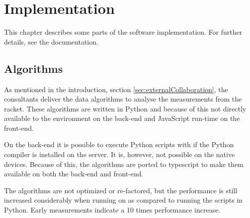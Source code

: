 \chapter{Implementation}
This chapter describes some parts of the software implementation.
For further details, see the documentation.

\section{Algorithms}
As mentioned in the introduction, section \ref{sec:externalCollaboration}, the consultants deliver the data algorithms to analyse the measurements from the racket.
These algorithms are written in Python and because of this not directly available to the  environment on the back-end and JavaScript run-time on the front-end.

On the back-end it is possible to execute Python scripts with  if the Python compiler is installed on the server.
It is, however, not possible on the native devices.
Because of this, the algorithms are ported to \gls{typescript} to make them available on both the back-end and front-end.

The algorithms are not optimized or re-factored, but the performance is still increased considerably when running on  as compared to running the scripts in Python.
Early measurements indicate a 10 times performance increase.





